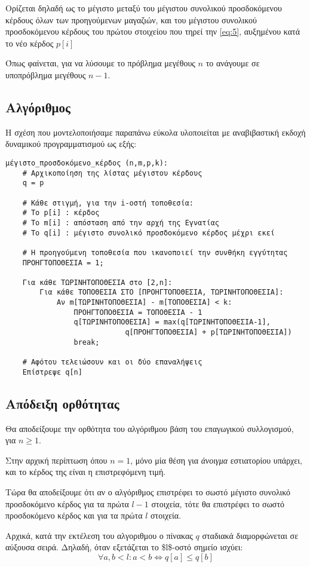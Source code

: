 \documentclass[11pt]{article}
\begin{document}
Ορίζεται δηλαδή ως το μέγιστο μεταξύ του μέγιστου συνολικού προσδοκόμενου
κέρδους όλων των προηγούμενων μαγαζιών, και του μέγιστου συνολικού προσδοκόμενου
κέρδους του πρώτου στοιχείου που τηρεί την \eqref{eq:5}, αυξημένου κατά το νέο
κέρδος \(p[i]\)

Όπως φαίνεται, για να λύσουμε το πρόβλημα μεγέθους \(n\) το ανάγουμε σε
υποπρόβλημα μεγέθους \(n-1\).
\subsection{Αλγόριθμος}
\label{sec:org924cb85}
Η σχέση που μοντελοποιήσαμε παραπάνω εύκολα υλοποιείται με αναβιβαστική εκδοχή
δυναμικού προγραμματισμού ως εξής:
\begin{verbatim}
μέγιστο_προσδοκόμενο_κέρδος (n,m,p,k):
    # Αρχικοποίηση της λίστας μέγιστου κέρδους
    q = p

    # Κάθε στιγμή, για την i-οστή τοποθεσία:
    # Το p[i] : κέρδος
    # Το m[i] : απόσταση από την αρχή της Εγνατίας
    # Το q[i] : μέγιστο συνολικό προσδοκόμενο κέρδος μέχρι εκεί

    # Η προηγούμενη τοποθεσία που ικανοποιεί την συνθήκη εγγύτητας
    ΠΡΟΗΓΤΟΠΟΘΕΣΙΑ = 1;

    Για κάθε ΤΩΡΙΝΗΤΟΠΟΘΕΣΙΑ στο [2,n]:
        Για κάθε ΤΟΠΟΘΕΣΙΑ ΣΤΟ [ΠΡΟΗΓΤΟΠΟΘΕΣΙΑ, ΤΩΡΙΝΗΤΟΠΟΘΕΣΙΑ]:
            Αν m[ΤΩΡΙΝΗΤΟΠΟΘΕΣΙΑ] - m[ΤΟΠΟΘΕΣΙΑ] < k:
                ΠΡΟΗΓΤΟΠΟΘΕΣΙΑ = ΤΟΠΟΘΕΣΙΑ - 1 
                q[ΤΩΡΙΝΗΤΟΠΟΘΕΣΙΑ] = max(q[ΤΩΡΙΝΗΤΟΠΟΘΕΣΙΑ-1],
                            q[ΠΡΟΗΓΤΟΠΟΘΕΣΙΑ] + p[ΤΩΡΙΝΗΤΟΠΟΘΕΣΙΑ])
                break;

    # Αφότου τελειώσουν και οι δύο επαναλήψεις        
    Επίστρεψε q[n]
\end{verbatim}
\subsection{Απόδειξη ορθότητας}
\label{sec:org80d646c}
Θα αποδείξουμε την ορθότητα του αλγόριθμου βάση του επαγωγικού συλλογισμού, για
\(n\geq 1\).

Στην αρχική περίπτωση όπου \(n = 1\), μόνο μία θέση για \emph{άνοιγμα} εστιατορίου
υπάρχει, και το κέρδος της είναι η επιστρεφόμενη τιμή.

Τώρα θα αποδείξουμε ότι αν ο αλγόριθμος επιστρέφει το σωστό μέγιστο συνολικό
προσδοκόμενο κέρδος για τα πρώτα \(l-1\) στοιχεία, τότε θα επιστρέφει το σωστό
προσδοκόμενο κέρδος και για τα πρώτα \(l\) στοιχεία.

Αρχικά, κατά την εκτέλεση του αλγοριθμου ο πίνακας \(q\) σταδιακά διαμορφώνεται σε
αύξουσα σειρά. Δηλαδή, όταν εξετάζεται το \$l\$-οστό σημείο ισχύει:
\begin{equation}
\label{eq:3}
\forall a,b < l: a < b \iff q[a] \leq q[b]
\end{equation}
\end{document}
